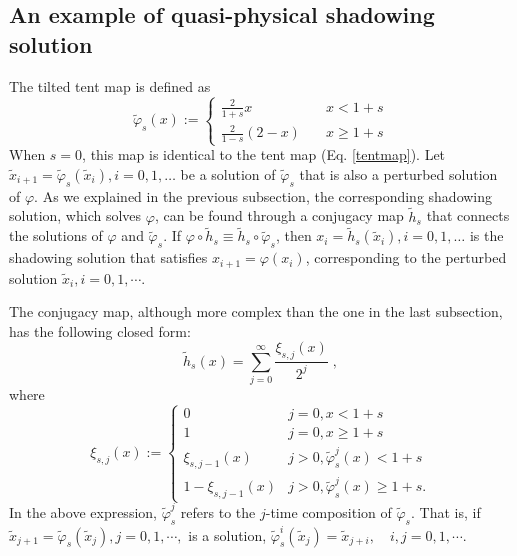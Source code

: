 \documentclass[preprint,12pt]{elsarticle}
\begin{document}
\subsection{An example of quasi-physical shadowing solution}
\label{sec:sub:quasi-physical-shadow}
The tilted tent map is defined as
\begin{equation} \label{tent_tilted}
    \tilde\varphi_s(x) := \begin{cases}
    \frac2{1+s} x \quad & x < 1+s \\
    \frac2{1-s}(2-x) \quad & x \ge 1+s
    \end{cases}
\end{equation}
When $s=0$, this map is identical to the tent map (Eq. \ref{tentmap}).
Let $\tilde{x}_{i+1}=\tilde\varphi_s(\tilde{x}_i), i=0,1,\ldots$ be a solution of 
$\tilde{\varphi}_s$ that is also a perturbed solution of $\varphi$.
As we explained in the previous subsection,
the corresponding 
shadowing solution, which solves $\varphi$, can be found through a conjugacy map $\tilde{h}_s$ that connects the solutions of $\varphi$ and $\tilde{\varphi}_s$.
If $\varphi\circ \tilde{h}_s \equiv \tilde{h}_s\circ\tilde\varphi_s$,
then $x_i=\tilde{h}_s(\tilde{x}_i), i=0,1,\ldots$ is the shadowing solution 
that satisfies $x_{i+1} = \varphi(x_i)$, corresponding to the perturbed solution 
$\tilde{x}_i,i=0,1,\cdots$.

The conjugacy map, although more complex than the one
in the last subsection, has the following closed form:
\begin{equation} \label{conjugate_tilted}
    \tilde{h}_s(x) = \sum_{j=0}^{\infty} \frac{\xi_{s,j}(x)}{2^j}\;,
\end{equation}
where
\begin{equation} \label{conjugate_tilted_helper}
    \xi_{s,j}(x) := \begin{cases}
    0 & j=0, x<1+s \\
    1 & j=0, x\ge 1+s \\
    \xi_{s,j-1}(x) & j>0, \tilde\varphi_s^j(x) < 1+s \\
    1 - \xi_{s,j-1}(x) & j>0, \tilde\varphi_s^j(x) \ge 1+s.
    \end{cases}
\end{equation}
In the above expression, $\tilde{\varphi}^j_s$ refers to the $j$-time 
composition of $\tilde{\varphi}_s.$ That is, if $\tilde{x}_{j+1} = \tilde{\varphi}_s(\tilde{x}_j), j = 0,1,\cdots,$ is a solution, $\tilde{\varphi}_s^i(\tilde{x}_j) = \tilde{x}_{j+i},\quad i,j = 0,1,\cdots$. 
\end{document}
